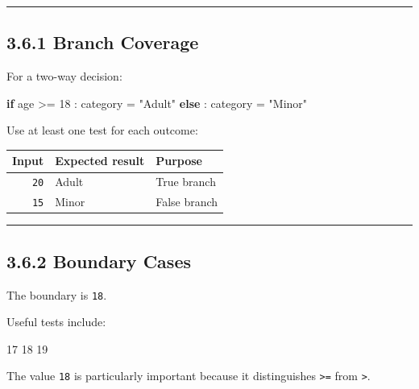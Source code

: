 \documentclass[
  11pt,
  a4paper,
]{article}
\newenvironment{Shaded}{}{}
\newcommand{\ControlFlowTok}[1]{\textcolor[rgb]{0.00,0.44,0.13}{\textbf{#1}}}
\newcommand{\DecValTok}[1]{\textcolor[rgb]{0.25,0.63,0.44}{#1}}
\newcommand{\NormalTok}[1]{#1}
\newcommand{\OperatorTok}[1]{\textcolor[rgb]{0.40,0.40,0.40}{#1}}
\newcommand{\StringTok}[1]{\textcolor[rgb]{0.25,0.44,0.63}{#1}}
\begin{document}
\begin{center}\rule{0.5\linewidth}{0.5pt}\end{center}

\subsection{3.6.1 Branch Coverage}\label{branch-coverage}

For a two-way decision:

\begin{Shaded}
\begin{Highlighting}[]
\ControlFlowTok{if}\NormalTok{ age }\OperatorTok{\textgreater{}=} \DecValTok{18}\NormalTok{ :}
\NormalTok{    category }\OperatorTok{=} \StringTok{"Adult"}
\ControlFlowTok{else}\NormalTok{ :}
\NormalTok{    category }\OperatorTok{=} \StringTok{"Minor"}
\end{Highlighting}
\end{Shaded}

Use at least one test for each outcome:

\begin{longtable}[]{@{}rll@{}}
\toprule\noalign{}
Input & Expected result & Purpose \\
\midrule\noalign{}
\endhead
\bottomrule\noalign{}
\endlastfoot
\texttt{20} & Adult & True branch \\
\texttt{15} & Minor & False branch \\
\end{longtable}

\begin{center}\rule{0.5\linewidth}{0.5pt}\end{center}

\subsection{3.6.2 Boundary Cases}\label{boundary-cases}

The boundary is \texttt{18}.

Useful tests include:

\begin{Shaded}
\begin{Highlighting}[]
\NormalTok{17}
\NormalTok{18}
\NormalTok{19}
\end{Highlighting}
\end{Shaded}

The value \texttt{18} is particularly important because it distinguishes
\texttt{\textgreater{}=} from \texttt{\textgreater{}}.
\end{document}
